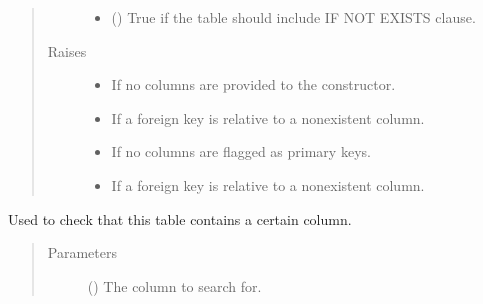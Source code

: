 \documentclass[letterpaper,10pt,english]{sphinxmanual}
\begin{document}
\begin{fulllineitems}
\begin{quote}
\begin{description}
\begin{itemize}
\item {} 
\sphinxAtStartPar
{} (\sphinxstyleliteralemphasis{\sphinxupquote{, }}) \textendash{} True if the table should include IF NOT EXISTS clause.

\end{itemize}

\item[{Raises}] \leavevmode\begin{itemize}
\item {} 
\sphinxAtStartPar
{} \textendash{} If no columns are provided to the constructor.

\item {} 
\sphinxAtStartPar
{} \textendash{} If a foreign key is relative to a non\sphinxhyphen{}existent column.

\item {} 
\sphinxAtStartPar
{} \textendash{} If no columns are flagged as primary keys.

\item {} 
\sphinxAtStartPar
{} \textendash{} If a foreign key is relative to a non\sphinxhyphen{}existent column.

\end{itemize}

\end{description}\end{quote}

\begin{fulllineitems}
\label{\detokenize{model:simple_sql.model.table.Table.contains}}
\sphinxAtStartPar
Used to check that this table contains a certain column.
\begin{quote}\begin{description}
\item[{Parameters}] \leavevmode
\sphinxAtStartPar
{} ({\hyperref[\detokenize{model:simple_sql.model.column.Column}]{}}) \textendash{} The column to search for.


\end{description}
\end{quote}
\end{fulllineitems}
\end{fulllineitems}
\end{document}
